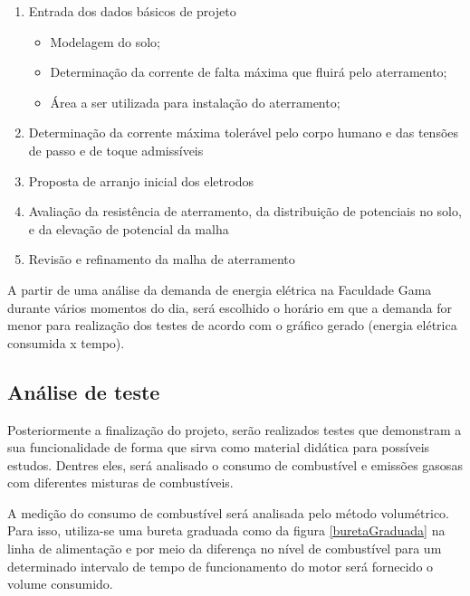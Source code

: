 \begin{enumerate}
	\item Entrada dos dados básicos de projeto
	\begin{itemize}
		\item Modelagem do solo;
		\item Determinação da corrente de falta máxima que fluirá pelo aterramento;
		\item Área a ser utilizada para instalação do aterramento; 
	\end{itemize}
	\item Determinação da corrente máxima tolerável pelo corpo humano e das tensões de passo e de toque admissíveis
	\item Proposta de arranjo inicial dos eletrodos
	\item Avaliação da resistência de aterramento, da distribuição de potenciais no solo, e da elevação de potencial da malha
	\item Revisão e refinamento da malha de aterramento
\end{enumerate}

A partir de uma análise da demanda de energia elétrica na Faculdade Gama durante vários momentos do dia, será escolhido o horário em que a demanda for menor para realização dos testes de acordo com o gráfico gerado (energia elétrica consumida x tempo).

\subsection{Análise de teste}

Posteriormente a finalização do projeto, serão realizados testes que demonstram a sua funcionalidade de forma que sirva como material didática para possíveis estudos. Dentres eles, será analisado o consumo de combustível e emissões gasosas com diferentes misturas de combustíveis. 

A medição do consumo de combustível será analisada pelo método volumétrico. Para isso, utiliza-se uma bureta graduada como da figura \ref{buretaGraduada} na linha de alimentação e por meio da diferença no nível de combustível para um determinado intervalo de tempo de funcionamento do motor será fornecido o volume consumido.

